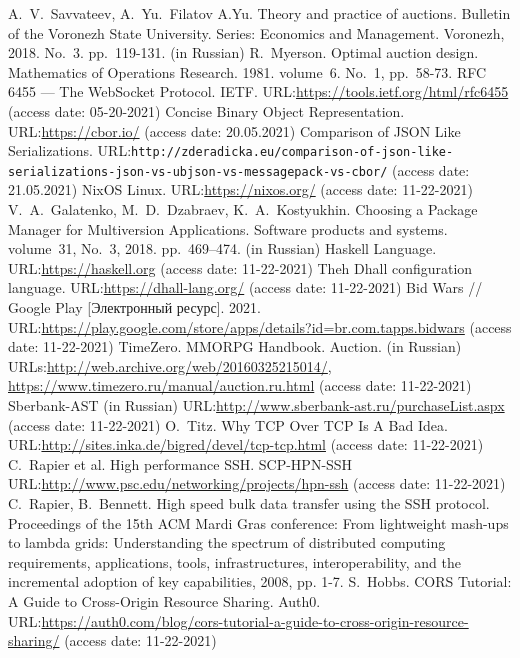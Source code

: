 \documentclass[
]{ceurart}
\begin{document}
\begin{thebibliography}{99}
    A.~V.~Savvateev, A.~Yu.~Filatov A.Yu. Theory and practice of auctions. Bulletin of the Voronezh State University. Series: Economics and Management. Voronezh, 2018. No.~3. pp.~119-131. (in Russian)
    R.~Myerson. Optimal auction design. Mathematics of Operations Research. 1981. volume~6. No.~1, pp.~58-73. 
    RFC 6455 — The WebSocket Protocol. IETF. URL:\url{https://tools.ietf.org/html/rfc6455} (access date: 05-20-2021)
    Concise Binary Object Representation. URL:\url{https://cbor.io/} (access date: 20.05.2021)
    Comparison of JSON Like Serializations. URL:\texttt{http://zderadicka.eu/comparison-of-json-like-serializations-json-vs-ubjson-vs-messagepack-vs-cbor/} (access date: 21.05.2021)
    NixOS Linux. URL:\url{https://nixos.org/} (access date: 11-22-2021)
    V.~A.~Galatenko, M.~D.~Dzabraev, K.~A.~Kostyukhin. Choosing a Package Manager for Multiversion Applications. Software products and systems. volume~31, No.~3, 2018. pp.~469–474. (in Russian) 
    Haskell Language. URL:\url{https://haskell.org} (access date: 11-22-2021)
    Theh Dhall configuration language. URL:\url{https://dhall-lang.org/} (access date: 11-22-2021)
	 Bid Wars // Google Play [Электронный ресурс]. 2021. URL:\url{https://play.google.com/store/apps/details?id=br.com.tapps.bidwars} (access date: 11-22-2021)
    TimeZero. MMORPG Handbook. Auction. (in Russian) URLs:\url{http://web.archive.org/web/20160325215014/}, \url{https://www.timezero.ru/manual/auction.ru.html} (access date: 11-22-2021)
    Sberbank-AST (in Russian) URL:\url{http://www.sberbank-ast.ru/purchaseList.aspx} (access date: 11-22-2021)
    O.~Titz. Why TCP Over TCP Is A Bad Idea. URL:\url{http://sites.inka.de/bigred/devel/tcp-tcp.html} (access date: 11-22-2021)
    C.~Rapier et al. High performance SSH. SCP-HPN-SSH URL:\url{http://www.psc.edu/networking/projects/hpn-ssh} (access date: 11-22-2021)
    C.~Rapier, B.~Bennett. High speed bulk data transfer using the SSH protocol. Proceedings of the 15th ACM Mardi Gras conference: From lightweight mash-ups to lambda grids: Understanding the spectrum of distributed computing requirements, applications, tools, infrastructures, interoperability, and the incremental adoption of key capabilities, 2008,  pp. 1-7. 
    S.~Hobbs. CORS Tutorial: A Guide to Cross-Origin Resource Sharing. Auth0. URL:\url{https://auth0.com/blog/cors-tutorial-a-guide-to-cross-origin-resource-sharing/} (access date: 11-22-2021)
\end{thebibliography}

\end{document}
